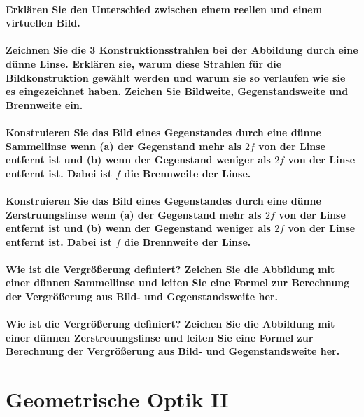 \documentclass[a4paper, 11pt, parskip=half]{scrartcl}
\begin{document}
\paragraph{Erklären Sie den Unterschied zwischen einem reellen und einem virtuellen Bild.}

\paragraph{Zeichnen Sie die 3 Konstruktionsstrahlen bei der Abbildung durch eine dünne Linse.
Erklären sie, warum diese Strahlen für die Bildkonstruktion gewählt werden und warum sie so
verlaufen wie sie es eingezeichnet haben. Zeichen Sie Bildweite, Gegenstandsweite und Brennweite
ein.}

\paragraph{Konstruieren Sie das Bild eines Gegenstandes durch eine dünne Sammellinse wenn (a) der
Gegenstand mehr als $2f$ von der Linse entfernt ist und (b) wenn der Gegenstand weniger als $2f$ von
der Linse entfernt ist. Dabei ist $f$ die Brennweite der Linse.}

\paragraph{Konstruieren Sie das Bild eines Gegenstandes durch eine dünne Zerstruungslinse wenn (a)
der Gegenstand mehr als $2f$ von der Linse entfernt ist und (b) wenn der Gegenstand weniger
als $2f$ von der Linse entfernt ist. Dabei ist $f$ die Brennweite der Linse.}

\paragraph{Wie ist die Vergrößerung definiert? Zeichen Sie die Abbildung mit einer dünnen
Sammellinse und leiten Sie eine Formel zur Berechnung der Vergrößerung aus Bild- und
Gegenstandsweite her.}

\paragraph{Wie ist die Vergrößerung definiert? Zeichen Sie die Abbildung mit einer dünnen
Zerstreuungslinse und leiten Sie eine Formel zur Berechnung der Vergrößerung aus Bild- und
Gegenstandsweite her.}

\newpage

\section{Geometrische Optik II}
\end{document}
